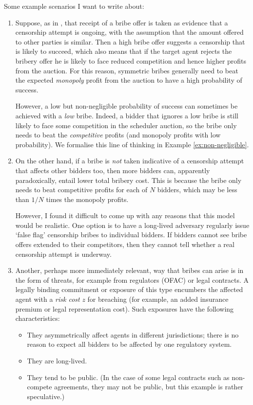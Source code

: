 Some example scenarios I want to write about:
\begin{enumerate}
  \item
    Suppose, as in \cite{FPR}, that receipt of a bribe offer is taken as evidence that a censorship attempt is ongoing, with the assumption that the amount offered to other parties is similar.
    Then a high bribe offer suggests a censorship that is likely to succeed, which also means that if the target agent rejects the bribery offer he is likely to face reduced competition and hence higher profits from the auction.
    For this reason, symmetric bribes generally need to beat the expected \emph{monopoly} profit from the auction to have a high probability of success.

    However, a low but non-negligible probability of success can sometimes be achieved with a \emph{low} bribe.
    Indeed, a bidder that ignores a low bribe is still likely to face some competition in the scheduler auction, so the bribe only needs to beat the \emph{competitive} profits (and monopoly profits with low probability).
    We formalise this line of thinking in Example \ref{ex:non-negligible}.

  \item
    On the other hand, if a bribe is \emph{not} taken indicative of a censorship attempt that affects other bidders too, then more bidders can, apparently paradoxically, entail lower total bribery cost.
    This is because the bribe only needs to beat competitive profits for each of $N$ bidders, which may be less than $1/N$ times the monopoly profits.

    However, I found it difficult to come up with any reasons that this model would be realistic.
    One option is to have a long-lived adversary regularly issue `false flag' censorship bribes to individual bidders.
    If bidders cannot see bribe offers extended to their competitors, then they cannot tell whether a real censorship attempt is underway.

  \item
    Another, perhaps more immediately relevant, way that bribes can arise is in the form of threats, for example from regulators (OFAC) or legal contracts.
    A legally binding commitment or exposure of this type encumbers the affected agent with a \emph{risk cost} $z$ for breaching (for example, an added insurance premium or legal representation cost).
    Such exposures have the following characteristics:
    \begin{itemize}
      \item They asymmetrically affect agents in different jurisdictions; there is no reason to expect all bidders to be affected by one regulatory system.
      \item They are long-lived.
      \item They tend to be public. (In the case of some legal contracts such as non-compete agreements, they may not be public, but this example is rather speculative.)
    \end{itemize}

\end{enumerate}

